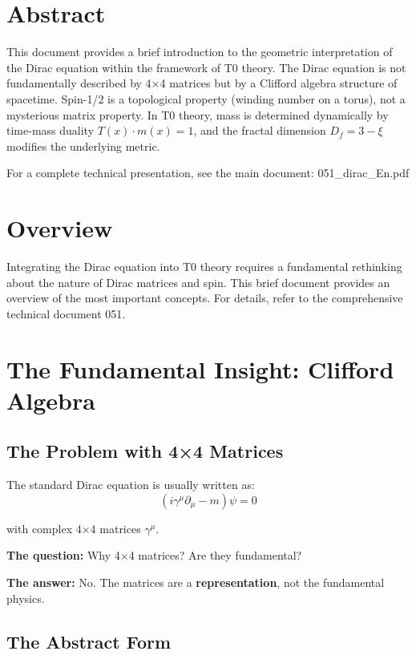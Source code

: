 \section*{Abstract}
		This document provides a brief introduction to the geometric interpretation 
		of the Dirac equation within the framework of T0 theory. The Dirac equation 
		is not fundamentally described by 4×4 matrices but by a Clifford algebra structure 
		of spacetime. Spin-1/2 is a topological property (winding number on a torus), 
		not a mysterious matrix property. In T0 theory, mass is determined dynamically 
		by time-mass duality $T(x) \cdot m(x) = 1$, and the fractal dimension $D_f = 3 - \xi$ 
		modifies the underlying metric.
		
		For a complete technical presentation, see the main document: 
		051\_dirac\_En.pdf

	
	
	\section{Overview}
	
	Integrating the Dirac equation into T0 theory requires a fundamental rethinking 
	about the nature of Dirac matrices and spin. This brief document provides an 
	overview of the most important concepts. For details, refer to the comprehensive 
	technical document 051.
	
	\section{The Fundamental Insight: Clifford Algebra}
	
	\subsection{The Problem with 4×4 Matrices}
	
	The standard Dirac equation is usually written as:
	\begin{equation}
		(i\gamma^\mu \partial_\mu - m)\psi = 0
	\end{equation}
	
	with complex 4×4 matrices $\gamma^\mu$.
	
	\textbf{The question:} Why 4×4 matrices? Are they fundamental?
	
	\textbf{The answer:} No. The matrices are a \textbf{representation}, not the 
	fundamental physics.
	
	\subsection{The Abstract Form}
	
